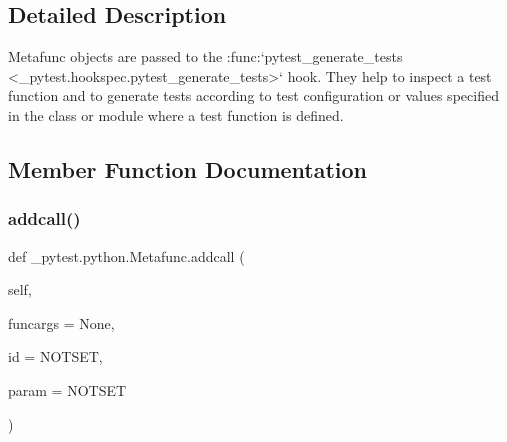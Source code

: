 \subsection{Detailed Description}
\begin{DoxyVerb}Metafunc objects are passed to the :func:`pytest_generate_tests <_pytest.hookspec.pytest_generate_tests>` hook.
They help to inspect a test function and to generate tests according to
test configuration or values specified in the class or module where a
test function is defined.
\end{DoxyVerb}
 

\subsection{Member Function Documentation}
\mbox{\label{class__pytest_1_1python_1_1_metafunc_adb6df445cadf2192144df7e44b66dd3b}} 
\subsubsection{\texorpdfstring{addcall()}{addcall()}}
{\footnotesize\ttfamily def \+\_\+pytest.\+python.\+Metafunc.\+addcall (\begin{DoxyParamCaption}\item[{}]{self,  }\item[{}]{funcargs = {\ttfamily None},  }\item[{}]{id = {\ttfamily NOTSET},  }\item[{}]{param = {\ttfamily NOTSET} }\end{DoxyParamCaption})}


